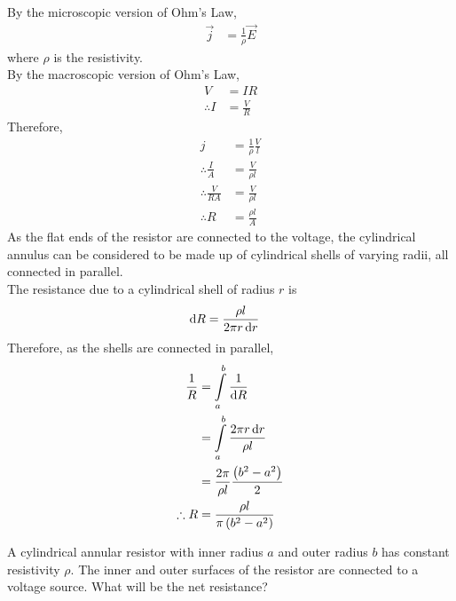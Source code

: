 \documentclass[fleqn, a4paper, 8pt, twoside]{amsart}
\theoremstyle{definition}
\theoremstyle{theorem}
\begin{document}
\begin{multicols}{2}
\begin{spacing}{0.6}
\begin{solution}
	By the microscopic version of Ohm's Law,
	\begin{align*}
		\overrightarrow{j} & = \frac{1}{\rho} \overrightarrow{E}
	\end{align*}
	where $\rho$ is the resistivity.\\
	By the macroscopic version of Ohm's Law,
	\begin{align*}
		V            & = I R \\
		\therefore I & = \frac{V}{R}
	\end{align*}
	Therefore,
	\begin{align*}
		j                        & = \frac{1}{\rho} \frac{V}{l} \\
		\therefore \frac{I}{A}   & = \frac{V}{\rho l}           \\
		\therefore \frac{V}{R A} & = \frac{V}{\rho l}           \\
		\therefore R             & = \frac{\rho l}{A}
	\end{align*}
	As the flat ends of the resistor are connected to the voltage, the cylindrical annulus can be considered to be made up of cylindrical shells of varying radii, all connected in parallel.\\
	The resistance due to a cylindrical shell of radius $r$ is
	\begin{align*}
		\dif R & = \frac{\rho l}{2 \pi r \dif r}
	\end{align*}
	Therefore, as the shells are connected in parallel,
	\begin{align*}
		\frac{1}{R}  & = \int\limits_{a}^{b} \frac{1}{ \dif R}                   \\
                             & = \int\limits_{a}^{b} \frac{2 \pi r \dif r}{\rho l}       \\
                             & = \frac{2 \pi}{\rho l} \frac{\left( b^2 - a^2 \right)}{2} \\
		\therefore R & = \frac{\rho l}{\pi \left( b^2 - a^2 \right)}
	\end{align*}
\end{solution}

\begin{question}
	A cylindrical annular resistor with inner radius $a$ and outer radius $b$ has constant resistivity $\rho$.
	The inner and outer surfaces of the resistor are connected to a voltage source.
	What will be the net resistance?
\end{question}


\end{spacing}
\end{multicols}
\end{document}
